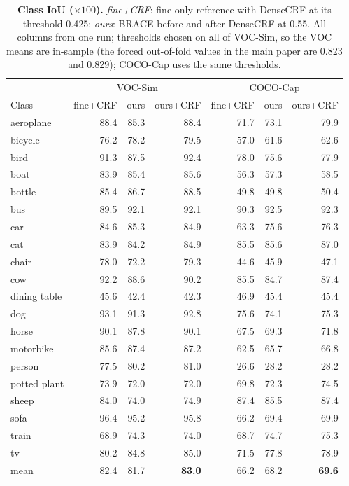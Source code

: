 \documentclass[10pt,twocolumn,letterpaper]{article}
\begin{document}
\begin{table}[t]
\centering
\scriptsize\setlength{\tabcolsep}{2.6pt}
\begin{tabular}{@{}lrrr|rrr@{}}
\toprule
& \multicolumn{3}{c|}{VOC-Sim} & \multicolumn{3}{c}{COCO-Cap} \\
Class & fine+CRF & ours & ours+CRF & fine+CRF & ours & ours+CRF \\
\midrule
aeroplane & 88.4 & 85.3 & 88.4 & 71.7 & 73.1 & 79.9 \\
bicycle & 76.2 & 78.2 & 79.5 & 57.0 & 61.6 & 62.6 \\
bird & 91.3 & 87.5 & 92.4 & 78.0 & 75.6 & 77.9 \\
boat & 83.9 & 85.4 & 85.6 & 56.3 & 57.3 & 58.5 \\
bottle & 85.4 & 86.7 & 88.5 & 49.8 & 49.8 & 50.4 \\
bus & 89.5 & 92.1 & 92.1 & 90.3 & 92.5 & 92.3 \\
car & 84.6 & 85.3 & 84.9 & 63.3 & 75.6 & 76.3 \\
cat & 83.9 & 84.2 & 84.9 & 85.5 & 85.6 & 87.0 \\
chair & 78.0 & 72.2 & 79.3 & 44.6 & 45.9 & 47.1 \\
cow & 92.2 & 88.6 & 90.2 & 85.5 & 84.7 & 87.4 \\
dining table & 45.6 & 42.4 & 42.3 & 46.9 & 45.4 & 45.4 \\
dog & 93.1 & 91.3 & 92.8 & 75.6 & 74.1 & 75.3 \\
horse & 90.1 & 87.8 & 90.1 & 67.5 & 69.3 & 71.8 \\
motorbike & 85.6 & 87.4 & 87.2 & 62.5 & 65.7 & 66.8 \\
person & 77.5 & 80.2 & 81.0 & 26.6 & 28.2 & 28.2 \\
potted plant & 73.9 & 72.0 & 72.0 & 69.8 & 72.3 & 74.5 \\
sheep & 84.0 & 74.0 & 74.9 & 87.4 & 85.5 & 87.4 \\
sofa & 96.4 & 95.2 & 95.8 & 66.2 & 69.4 & 69.9 \\
train & 68.9 & 74.3 & 74.0 & 68.7 & 74.7 & 75.3 \\
tv & 80.2 & 84.8 & 85.0 & 71.5 & 77.8 & 78.9 \\
\midrule
mean & 82.4 & 81.7 & \textbf{83.0} & 66.2 & 68.2 & \textbf{69.6} \\
\bottomrule
\end{tabular}
\caption{\textbf{Class IoU ($\times100$).} \emph{fine+CRF}: fine-only reference with DenseCRF at its threshold 0.425; \emph{ours}: BRACE before and after DenseCRF at 0.55. All columns from one run; thresholds chosen on all of VOC-Sim, so the VOC means are in-sample (the forced out-of-fold values in the main paper are 0.823 and 0.829); COCO-Cap uses the same thresholds.}
\label{tab:s_classes}
\end{table}
\end{document}
